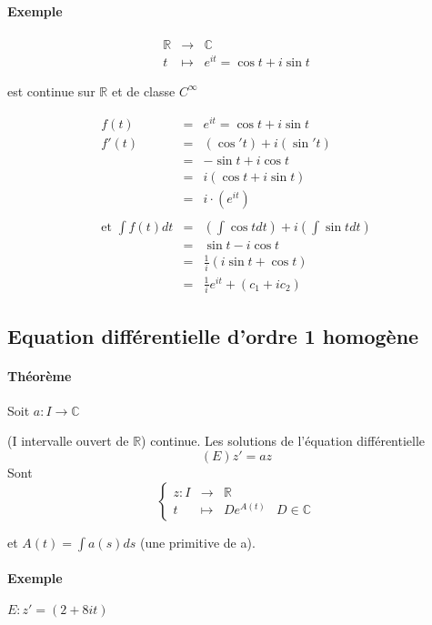 \paragraph{Exemple}

\[\begin{array}{rcl}
	\mathbb{R} &\rightarrow& \mathbb{C} \\
	t &\mapsto& e^{it} = \cos t + i \sin t
\end{array}\]

est continue sur $\mathbb{R}$ et de classe $C^\infty$

\[\begin{array}{rcl}
	f(t) &=& e^{it} = \cos t + i \sin t \\
	f'(t) &=& (\cos 't) + i(\sin 't) \\
		&=& -\sin t + i \cos t \\
		&=& i(\cos t + i \sin t) \\
		&=& i\cdot(e^{it}) \\
							\\
	\text{et } \int f(t)dt &=& (\int\cos t dt) + i (\int \sin t dt) \\
		&=& \sin t - i \cos t \\
		&=&  \frac{1}{i}(i \sin t + \cos t) \\
		&=& \frac{1}{i} e^{it} + (c_1 + i c_2)
\end{array}\]

\subsection{Equation différentielle d'ordre 1 homogène}

\paragraph{Théorème} Soit $a : I \rightarrow \mathbb{C}$

(I intervalle ouvert de $\mathbb{R}$) continue. Les solutions de l'équation différentielle \[(E) z' = az\]
Sont \[\left\{\begin{array}{rclr}
z : I & \rightarrow& \mathbb{R} \\
t &\mapsto & De^{A(t)} & D \in \mathbb{C}\end{array}\right.\]

et $A(t)=\int a(s)ds$ (une primitive de a).

\paragraph{Exemple} $E : z' = (2+8it)$

